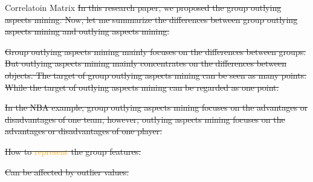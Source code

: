 \documentclass[
 size=14pt,
 paper=smartboard,  %
 mode=present, 		%
 display=slides, 	%
 style=tuliplab,  	%
 pauseslide,
 fleqn,leqno]{powerdot}
\providecommand{\DIFdeltex}[1]{{\protect\color{red}\sout{#1}}}                      %
\providecommand{\DIFdelbegin}{} %
\providecommand{\DIFdelend}{} %
\providecommand{\DIFdel}[1]{\texorpdfstring{\DIFdeltex{#1}}{}} %
\newcommand{\DIFscaledelfig}{0.5}
\newlength{\DIFdelgraphicswidth} %
\newlength{\DIFdelgraphicsheight} %
\newcommand{\DIFdelincludegraphics}[2][]{%
\sbox{\DIFdelgraphicsbox}{\DIFOincludegraphics[#1]{#2}}%
\settoboxwidth{\DIFdelgraphicswidth}{\DIFdelgraphicsbox} %
\settoboxtotalheight{\DIFdelgraphicsheight}{\DIFdelgraphicsbox} %
\scalebox{\DIFscaledelfig}{%
\parbox[b]{\DIFdelgraphicswidth}{\usebox{\DIFdelgraphicsbox}\\[-\baselineskip] \rule{\DIFdelgraphicswidth}{0em}}\llap{\resizebox{\DIFdelgraphicswidth}{\DIFdelgraphicsheight}{%
\setlength{\unitlength}{\DIFdelgraphicswidth}%
\begin{picture}(1,1)%
\thicklines\linethickness{2pt} %
{\color[rgb]{1,0,0}\put(0,0){\framebox(1,1){}}}%
{\color[rgb]{1,0,0}\put(0,0){\line( 1,1){1}}}%
{\color[rgb]{1,0,0}\put(0,1){\line(1,-1){1}}}%
\end{picture}%
}\hspace*{3pt}}} %
} %
\DeclareRobustCommand{\DIFdelbegin}{\DIFOdelbegin \let\includegraphics\DIFdelincludegraphics} %
\DeclareRobustCommand{\DIFdelend}{\DIFOaddend \let\includegraphics\DIFOincludegraphics} %
\begin{document}
\begin{slide}[toc=,bm=]{Correlatoin Matrix}
\DIFdel{In this research paper,
we proposed the group outlying aspects mining.
Now,
let me summarize the differences between group outlying aspects mining and outlying aspects mining.
}%

\DIFdel{Group outlying aspects mining mainly focuses on the differences between groups.
But outlying aspects mining mainly concentrates on the differences between objects.
The target of group outlying aspects mining can be seen as many points.
While the target of outlying aspects mining can be regarded as one point.
}%

\DIFdel{In the NBA example,
group outlying aspects mining focuses on the advantages
or disadvantages of one team,
however,
outlying aspects mining focuses on the advantages or disadvantages of one player.
}%

\DIFdelend \end{slide}

  
\DIFdelbegin %
\DIFdel{How to \textcolor{orange}{represent} the group features.
}\DIFdelend %

\DIFdelbegin %
\DIFdel{Can be affected by outlier values.
}\DIFdelend %
\end{document}
